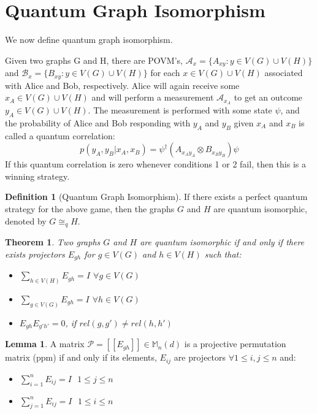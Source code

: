 \documentclass[12pt]{article}
\newtheorem{Theorem}{Theorem}
\theoremstyle{definition}
\newtheorem{defn}{Definition}[section]
\theoremstyle{proposition}
\theoremstyle{lemma}
\newtheorem{lem}{Lemma}[section]
\begin{document}
\section{Quantum Graph Isomorphism}
We now define quantum graph isomorphism. 

Given two graphs G and H, there are POVM's, $\mathcal{A}_x = \{A_{xy}: y \in V(G) \cup V(H)\}$ and $\mathcal{B}_x = \{B_{xy}: y \in V(G) \cup V(H)\}$ for each $x \in V(G) \cup V(H)$ associated with Alice and Bob, respectively.
Alice will again receive some $x_A \in V(G) \cup V(H)$ and will perform a measurement $\mathcal{A}_{x_A}$ to get an outcome $y_A \in V(G) \cup V(H)$.
The measurement is performed with some state $\psi$, and the probability of Alice and Bob responding with $y_A$ and $y_B$ given $x_A$ and $x_B$ is called a quantum correlation: 
\begin{equation}
p(y_A, y_B|x_A, x_B) = \psi^\dag(A_{x_Ay_A}\otimes B_{x_By_B})\psi
\end{equation}
If this quantum correlation is zero whenever conditions 1 or 2 fail, then this is a winning strategy.

\begin{defn}[Quantum Graph Isomorphism]
If there exists a perfect quantum strategy for the above game, then the graphs $G$ and $H$ are quantum isomorphic, denoted by $G \cong_q H$.
\end{defn}

\begin{Theorem}
Two graphs $G$ and $H$ are quantum isomorphic if and only if there exists projectors $E_{gh}$ for $g \in V(G)$ and $h \in V(H)$ such that:
\begin{itemize}
\item $\sum_{h \in V(H)} E_{gh} = I$  $\forall g \in V(G)$
\item $\sum_{g \in V(G)} E_{gh} = I$  $\forall h \in V(G)$
\item $E_{gh}E_{g'h'} = 0$, if $rel(g, g') \neq rel(h, h')$
\end{itemize}
\end{Theorem}


\begin{lem}
A matrix $\mathcal{P} = [[E_{gh}]] \in \mathbb{M}_n(d)$ is a projective permutation matrix (ppm) if and only if its elements, $E_{ij}$ are projectors $\forall 1 \leq i, j \leq n$ and:
\begin{itemize}
\item $\sum_{i=1}^n E_{ij} = I$ $ $ $1 \leq j \leq n$
\item $\sum_{j=1}^n E_{ij} = I$ $ $ $1 \leq i \leq n$
\end{itemize}

\end{lem}
\end{document}
